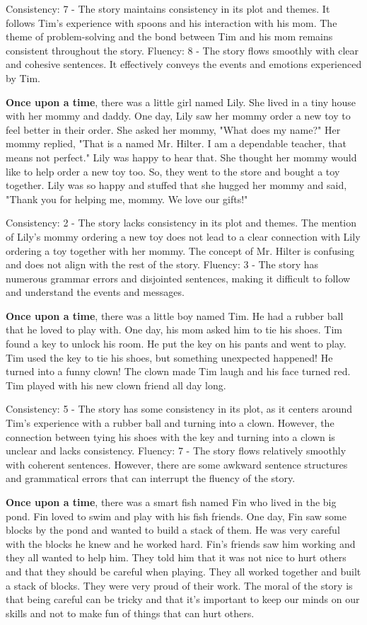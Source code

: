 \documentclass{article}
\begin{document}
Consistency: 7 - The story maintains consistency in its plot and themes. It follows Tim's experience with spoons and his interaction with his mom. The theme of problem-solving and the bond between Tim and his mom remains consistent throughout the story.
Fluency: 8 - The story flows smoothly with clear and cohesive sentences. It effectively conveys the events and emotions experienced by Tim.

\textbf{Once upon a time}, there was a little girl named Lily. She lived in a tiny house with her mommy and daddy. One day, Lily saw her mommy order a new toy to feel better in their order. She asked her mommy, "What does my name?" Her mommy replied, "That is a named Mr. Hilter. I am a dependable teacher, that means not perfect." Lily was happy to hear that. She thought her mommy would like to help order a new toy too. So, they went to the store and bought a toy together. Lily was so happy and stuffed that she hugged her mommy and said, "Thank you for helping me, mommy. We love our gifts!"

Consistency: 2 - The story lacks consistency in its plot and themes. The mention of Lily's mommy ordering a new toy does not lead to a clear connection with Lily ordering a toy together with her mommy. The concept of Mr. Hilter is confusing and does not align with the rest of the story.
Fluency: 3 - The story has numerous grammar errors and disjointed sentences, making it difficult to follow and understand the events and messages.

\textbf{Once upon a time}, there was a little boy named Tim. He had a rubber ball that he loved to play with. One day, his mom asked him to tie his shoes. Tim found a key to unlock his room. He put the key on his pants and went to play. Tim used the key to tie his shoes, but something unexpected happened! He turned into a funny clown! The clown made Tim laugh and his face turned red. Tim played with his new clown friend all day long.

Consistency: 5 - The story has some consistency in its plot, as it centers around Tim's experience with a rubber ball and turning into a clown. However, the connection between tying his shoes with the key and turning into a clown is unclear and lacks consistency.
Fluency: 7 - The story flows relatively smoothly with coherent sentences. However, there are some awkward sentence structures and grammatical errors that can interrupt the fluency of the story.

\textbf{Once upon a time}, there was a smart fish named Fin who lived in the big pond. Fin loved to swim and play with his fish friends. One day, Fin saw some blocks by the pond and wanted to build a stack of them. He was very careful with the blocks he knew and he worked hard. Fin's friends saw him working and they all wanted to help him. They told him that it was not nice to hurt others and that they should be careful when playing. They all worked together and built a stack of blocks. They were very proud of their work. The moral of the story is that being careful can be tricky and that it's important to keep our minds on our skills and not to make fun of things that can hurt others.
\end{document}
